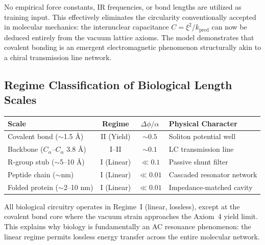 No empirical force constants, IR frequencies, or bond lengths are utilized as training input. This effectively eliminates the circularity conventionally accepted in molecular mechanics: the internuclear capacitance $C = \xi^2/k_\text{pred}$ can now be deduced entirely from the vacuum lattice axioms. The model demonstrates that covalent bonding is an emergent electromagnetic phenomenon structurally akin to a chiral transmission line network.

\subsection*{Regime Classification of Biological Length Scales}
\begin{center}
\small
\renewcommand{\arraystretch}{1.2}
\begin{tabular}{lccl}
\toprule
\textbf{Scale} & \textbf{Regime} & \textbf{$\Delta\phi/\alpha$} & \textbf{Physical Character} \\
\midrule
Covalent bond ($\sim$1.5 \AA) & II (Yield) & $\sim 0.5$ & Soliton potential well \\
Backbone ($C_\alpha$--$C_\alpha$ 3.8 \AA) & I--II & $\sim 0.1$ & LC transmission line \\
R-group stub ($\sim$5--10 \AA) & I (Linear) & $\ll 0.1$ & Passive shunt filter \\
Peptide chain ($\sim$nm) & I (Linear) & $\ll 0.01$ & Cascaded resonator network \\
Folded protein ($\sim$2--10 nm) & I (Linear) & $\ll 0.01$ & Impedance-matched cavity \\
\bottomrule
\end{tabular}
\end{center}

\noindent All biological circuitry operates in Regime~I (linear, lossless), except at the covalent bond core where the vacuum strain approaches the Axiom~4 yield limit. This explains why biology is fundamentally an AC resonance phenomenon: the linear regime permits lossless energy transfer across the entire molecular network.
